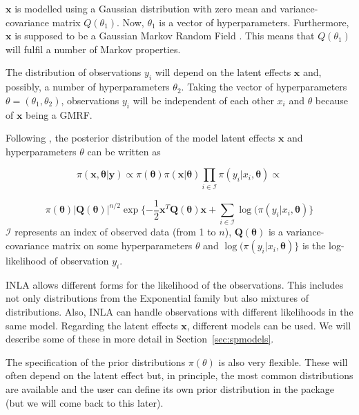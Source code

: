 \documentclass[article]{jss}
\begin{document}
$\mathbf{x}$ is modelled using a Gaussian distribution with zero mean and
variance-covariance matrix $Q(\theta_1)$. Now, $\theta_1$ is a vector of
hyperparameters. Furthermore, $\mathbf{x}$ is supposed to be a Gaussian Markov
Random Field \citep[GMRF,][]{rueheld:2005}. This means that  $Q(\theta_1)$ will fulfil a number of
Markov properties. 

The distribution of observations $y_i$ will depend on the latent effects
$\mathbf{x}$ and, possibly, a number of hyperparameters $\theta_2$.  Taking
the vector of hyperparameters $\theta=(\theta_1, \theta_2)$, observations
$y_i$ will be independent of each other $x_i$ and $\theta$ because
of $\mathbf{x}$ being a GMRF.

Following \citet{isi:000264374200002}, the posterior distribution of the model
latent effects $\mathbf{x}$ and hyperparameters $\theta$ can be written as 

\begin{equation}
\pi(\mathbf{x}, \mathbf{\theta}|\mathbf{y}) \propto
\pi(\mathbf{\theta}) \pi(\mathbf{x}|\mathbf{\theta})\prod_{i\in \mathcal{I}}\pi(y_i|x_i,\mathbf{\theta})
\propto 
\end{equation}

\begin{equation}
\pi(\mathbf{\theta}) |\mathbf{Q}(\mathbf{\theta})|^{n/2} \exp\{-\frac{1}{2}\mathbf{x}^T \mathbf{Q}(\mathbf{\theta}) \mathbf{x}+\sum_{i\in\mathcal{I}} \log(\pi(y_i|x_i, \mathbf{\theta}) \}
\end{equation}
\noindent
$\mathcal{I}$ represents an index of observed data (from 1 to $n$),
$\mathbf{Q}(\mathbf{\theta})$ is a variance-covariance matrix on some
hyperparameters $\theta$ and $\log(\pi(y_i|x_i, \mathbf{\theta}) \}$ is
the log-likelihood of observation $y_i$.

INLA allows different forms for the likelihood of the observations.  This
includes not only distributions from the Exponential family but also mixtures
of distributions. Also, INLA can handle observations with different likelihoods
in the same model. Regarding the latent effects $\mathbf{x}$, different models
can be used. We will describe some of these in more detail in
Section~\ref{sec:spmodels}.


The specification of the prior distributions $\pi(\theta)$ is also very 
flexible. These will often depend on the latent effect but, in principle,
the most common distributions are available and the user can define its
own prior distribution in the  package (but we will come
back to this later). 
\end{document}
